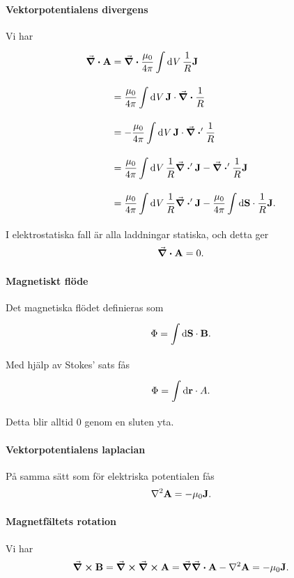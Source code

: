 \paragraph{Vektorpotentialens divergens}
Vi har
\begin{align*}
	\div{\vb{A}} &= \div{\frac{\mu_{0}}{4\pi}\int\limits_{}^{}\dd[]{V}\frac{1}{R}\vb{J}} \\
	             &= \frac{\mu_{0}}{4\pi}\int\limits_{}^{}\dd[]{V}\vb{J}\cdot\div{\frac{1}{R}} \\
	             &= -\frac{\mu_{0}}{4\pi}\int\limits_{}^{}\dd[]{V}\vb{J}\cdot\div'{\frac{1}{R}} \\
	             &= \frac{\mu_{0}}{4\pi}\int\limits_{}^{}\dd[]{V}\frac{1}{R}\div'{\vb{J}} - \div'{\frac{1}{R}\vb{J}} \\
	             &= \frac{\mu_{0}}{4\pi}\int\limits_{}^{}\dd[]{V}\frac{1}{R}\div'{\vb{J}} -  \frac{\mu_{0}}{4\pi}\int\limits_{}^{}\dd{\vb{S}}\cdot \frac{1}{R}\vb{J}.
\end{align*}
I elektrostatiska fall är alla laddningar statiska, och detta ger
\begin{align*}
	\div{\vb{A}} = 0.
\end{align*}

\paragraph{Magnetiskt flöde}
Det magnetiska flödet definieras som
\begin{align*}
	\Phi = \int\limits_{}^{}\dd{\vb{S}}\cdot \vb{B}.
\end{align*}
Med hjälp av Stokes' sats fås
\begin{align*}
	\Phi = \int\limits_{}^{}\dd{\vb{r}}\cdot A.
\end{align*}
Detta blir alltid $0$ genom en sluten yta.

\paragraph{Vektorpotentialens laplacian}
På samma sätt som för elektriska potentialen fås
\begin{align*}
	\laplacian{\vb{A}} = -\mu_{0}\vb{J}.
\end{align*}

\paragraph{Magnetfältets rotation}
Vi har
\begin{align*}
	\curl{\vb{B}} = \curl{\curl{\vb{A}}} = \grad{\div{\vb{A}}} - \laplacian{\vb{A}} = -\mu_{0}\vb{J}.
\end{align*}


